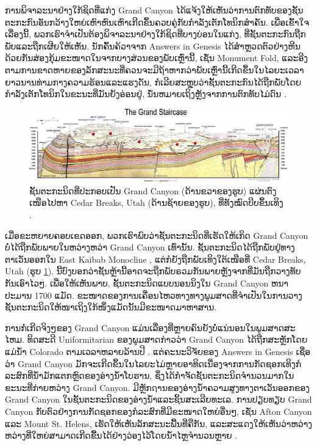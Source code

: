 \documentclass[10pt,twocolumn,letterpaper]{article}
\begin{document}
ການພິຈາລະນາຢ່າງໃກ້ຊິດທີ່ແກ່ງ Grand Canyon ໄດ້ແຈ້ງໃຫ້ເຫັນວ່າການຕົກທັບຂອງຊັ້ນຕະກະກົນອັນກວ້າງໃຫຍ່ເຫົາຫົນເຫົາເກີດຂຶ້ນຄວບຄູ່ກັບກຳລັງເຕັກໂທນິກສຳຄັນ. ເພື່ອເຂົ້າໃຈເລື່ອງນີ້, ພວກເຮົາຈຳເປັນຕ້ອງພິຈາລະນາຢ່າງໃກ້ຊິດທີ່ບາງບ່ອນໃນແກ່ງ, ທີ່ຊັ້ນຕະກະກົນຖືກພັບແລະຖືກເຜີຍໃຫ້ເຫັນ. ນັກຄົ້ນຄ້ວາຈາກ Answers in Genesis \cite{42} ໄດ້ສຳຫຼວດຕົວຢ່າງຫີນດ້ວຍກັນສ່ອງກຸ້ມຂະໜາດໃນຈາກບາງສ່ວນຂອງພັບເຫຼົ່ານີ້, ເຊັ່ນ Monument Fold, ແລະອີງຕາມການຂາດຫາຍຂອງລັກສະນະທີ່ຄວນຈະມີຖ້າຫາກວ່າພັບເຫຼົ່ານີ້ເກີດຂຶ້ນໃນໄລຍະເວລາຍາວນານທ່າມກາງຄວາມຮ້ອນແລະແຮງດັນ, ກໍເລີຍສະຫຼຸບວ່າຊັ້ນຕະກະກົນໄດ້ຖືກພັບໂດຍກຳລັງເຕັກໂທນິກໃນຂະນະທີ່ມັນຍັງອ່ອນຢູ່, ນັ່ນຫມາຍເຖິງຫຼັງຈາກການຕົກທັບໄມ່ດົນ \cite{43}.

\begin{figure}
\begin{center}
\includegraphics[width=1\textwidth]{Grand_Staircase-big.jpg}
\end{center}
   \caption{ຊັ້ນຕະກະນິດທີ່ປະກອບເປັນ Grand Canyon (ດ້ານຂວາຂອງຮູບ) ແຜ່ນຕົງເໜືອໄປຫາ Cedar Breaks, Utah (ດ້ານຊ້າຍຂອງຮູບ), ທີ່ທັງໝົດບີບຂຶ້ນເທິງ \cite{50}.}
\label{fig:4}
\end{figure}

ເມື່ອຂະຫຍາຍຄອບເຂດອອກ, ພວກເຮົາພົບວ່າຊັ້ນຕະກະນິດທີ່ເຮັດໃຫ້ເກິດ Grand Canyon ບໍ່ໄດ້ຖືກພັບພາຍໃນຫວ່າງຫວ່າ Grand Canyon ເທົ່ານັ້ນ. ຊັ້ນຕະກະນິດໄດ້ຖືກພັບຢູ່ທາງຕາເວັນອອກໃນ East Kaibab Monocline \cite{46}, ແຕ່ກໍຍັງຖືກພັບເທິງໃຕ້ເໜືອທີ່ Cedar Breaks, Utah (ຮູບ \ref{fig:4}). ນີ້ບົງບອກວ່າຊັ້ນຫຼ້ານີ້ອາດຈະຖືກພັບຣວມກັນພາຍຫຼັງຈາກທີ່ມັນຖືກວາງທັບກັນເອົາໄວໆ. ເພື່ອໃຫ້ເຫັນພາບ, ຊັ້ນຕະກະນິດແບບນອນນິງໃນ Grand Canyon ຫນາປະມານ 1700 ແມັດ. ຂະໜາດຂອງການເຄື່ອນໄຫວທາງທາງພູມສາດທີ່ຈຳເປັນໃນການວາງຊັ້ນຕະກະນິດໃຫ້ໜາເຖິງໃກ້ໜຶ່ງແມັດນັ້ນມີຂະໜາດມາຫາສານ.

ການກໍ່ເກີດຈິງໆຂອງ Grand Canyon ແມ່ນເລື່ອງທີ່ຫຼາຍຄົນຍັງບໍ່ແນ່ນອນໃນພູມສາດສະໄຫມ. ທິດສະດີ Uniformitarian ຂອງພູມສາດກ່າວວ່າ Grand Canyon ໄດ້ຖືກສະຫຼັກໂດຍແມ່ນ້ຳ Colorado ຕາມເວລາຫລາຍລ້ານປີ \cite{47}. ແຕ່ຄະນະວິຈັຍຂອງ Answers in Genesis ເຊື່ອວ່າ Grand Canyon ມັກຈະເກີດຂຶ້ນໃນໄລຍະໄມ່ຫຼາຍອາທິດເນື່ອງຈາກການກັດຊອກເທິງກໍລະສົກທີ່ນ້ຳມັກແຕກຫຼົດຂອງອ່າງນ້ຳໂບຮານ, ຊຶ່ງໄດ້ກຳຈັດຊັ້ນຕະກະນິດຈຳນວນມາກໃນຂະນະທີ່ກ່າຍຫວ່າງ Grand Canyon. ມີຫຼັກຐານຂອງອ່າງນ້ຳຄວາມສູງທາງຕາເວັນອອກຂອງ Grand Canyon ໃນຊັ້ນຕະກະນິດຂອງອ່າງນ້ຳແລະຊິ້ນສະເລີຍທະເລ. ການປຽບທຽບ Grand Canyon ກັບຕົວຢ່າງການກັດຊອກຂອງກໍລະສົກທີ່ມີຂະໜາດໃຫຍ່ອື່ນໆ, ເຊັ່ນ Afton Canyon ແລະ Mount St. Helens, ເຮັດໃຫ້ເຫັນລັກສະນະພື້ນທີ່ຄືກັນ, ແລະສະແດງໃຫ້ເຫັນວ່າຫວ່າງຫວ່າງທີ່ໃຫຍ່ສາມາດເກີດຂື້ນໄດ້ຢ່າງວ່ອງໄວ້ໂດຍນ້ຳໄຫຼຈຳນວນຫຼາຍ \cite{48}.
\end{document}
